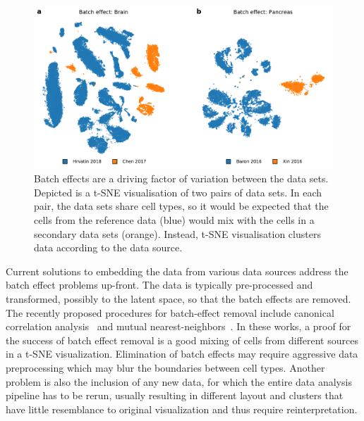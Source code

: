 \documentclass[runningheads]{llncs}
\begin{document}
\begin{figure}[htbp]
\includegraphics[width=\textwidth]{figures/batch_effect.pdf}
\caption{Batch effects are a driving factor of variation between the data sets. Depicted is a t-SNE visualisation of two pairs of data sets. In each pair, the data sets share cell types, so it would be expected that the cells from the reference data (blue) would mix with the cells in a secondary data sets (orange). Instead, t-SNE visualisation clusters data according to the data source.} \label{fig:batch_effect}
\end{figure}

Current solutions to embedding the data from various data sources address the batch effect problems up-front. The data is typically pre-processed and transformed, possibly to the latent space, so that the batch effects are removed. The recently proposed procedures for batch-effect removal include canonical correlation analysis~\cite{cca} and mutual nearest-neighbors~\cite{mnn,seurat}. In these works, a proof for the success of batch effect removal is a good mixing of cells from different sources in a t-SNE visualization. Elimination of batch effects may require aggressive data preprocessing which may blur the boundaries between cell types. Another problem is also the inclusion of any new data, for which the entire data analysis pipeline has to be rerun, usually resulting in different layout and clusters that have little resemblance to original visualization and thus require reinterpretation.
\end{document}
